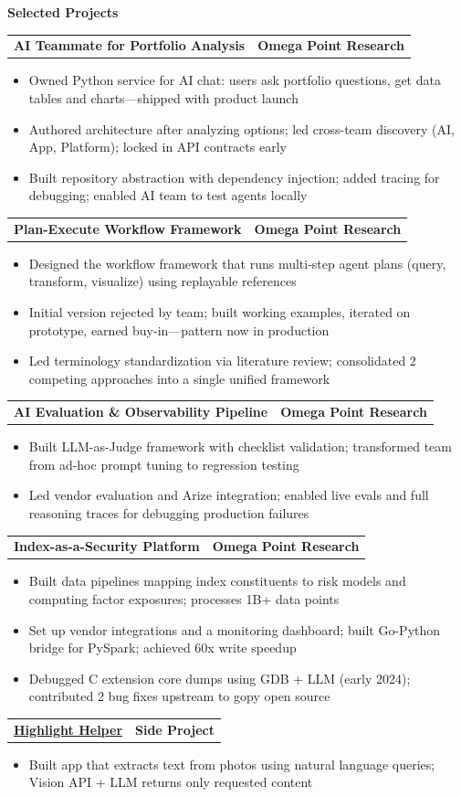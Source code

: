 \documentclass[letterpaper,10pt]{article}
\newcommand{\myitem}{\item[$\triangleright$]}
\newcommand{\resHeading}[1]{{
		\begin{tcolorbox}[size=title, sharp corners, colback=mygrey, colframe=mygrey]
			\centering\textbf{\large #1}
		\end{tcolorbox}
	}}
\newcommand{\twoColSubHeading}[2]{
		\begin{tabularx}{\columnwidth}{Xr}
				\textbf{#1} & \textbf{#2}
		\end{tabularx}
	}
\begin{document}
	\resHeading{Selected Projects}
		\twoColSubHeading{AI Teammate for Portfolio Analysis}{Omega Point Research}
		\begin{itemize}
			\myitem Owned Python service for AI chat: users ask portfolio questions, get data tables and charts---shipped with product launch
			\myitem Authored architecture after analyzing options; led cross-team discovery (AI, App, Platform); locked in API contracts early
			\myitem Built repository abstraction with dependency injection; added tracing for debugging; enabled AI team to test agents locally
		\end{itemize}
		\twoColSubHeading{Plan-Execute Workflow Framework}{Omega Point Research}
		\begin{itemize}
			\myitem Designed the workflow framework that runs multi-step agent plans (query, transform, visualize) using replayable references
			\myitem Initial version rejected by team; built working examples, iterated on prototype, earned buy-in---pattern now in production
			\myitem Led terminology standardization via literature review; consolidated 2 competing approaches into a single unified framework
		\end{itemize}
		\twoColSubHeading{AI Evaluation \& Observability Pipeline}{Omega Point Research}
		\begin{itemize}
			\myitem Built LLM-as-Judge framework with checklist validation; transformed team from ad-hoc prompt tuning to regression testing
			\myitem Led vendor evaluation and Arize integration; enabled live evals and full reasoning traces for debugging production failures
		\end{itemize}
		\twoColSubHeading{Index-as-a-Security Platform}{Omega Point Research}
		\begin{itemize}
			\myitem Built data pipelines mapping index constituents to risk models and computing factor exposures; processes 1B+ data points
			\myitem Set up vendor integrations and a monitoring dashboard; built Go-Python bridge for PySpark; achieved 60x write speedup
			\myitem Debugged C extension core dumps using GDB + LLM (early 2024); contributed 2 bug fixes upstream to gopy open source
		\end{itemize}
		\twoColSubHeading{\underline{\href{https://github.com/EvanOman/highlight-helper}{Highlight Helper}}}{Side Project}
		\begin{itemize}
			\myitem Built app that extracts text from photos using natural language queries; Vision API + LLM returns only requested content
		\end{itemize}
\end{document}
